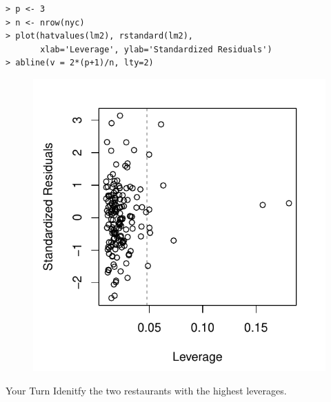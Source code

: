 \documentclass[10pt]{beamer}\usepackage[]{graphicx}\usepackage[]{color}
\begin{document}
\begin{frame}[fragile]
\small
\begin{verbatim}
> p <- 3
> n <- nrow(nyc)
> plot(hatvalues(lm2), rstandard(lm2), 
       xlab='Leverage', ylab='Standardized Residuals')
> abline(v = 2*(p+1)/n, lty=2)
\end{verbatim}
\begin{figure}
\includegraphics[scale=0.6]{figure/influence1.pdf}
\end{figure}
\end{frame}

\begin{frame}{Your Turn}
\large
Idenitfy the two restaurants with the highest leverages.\\
\end{frame}
\end{document}
